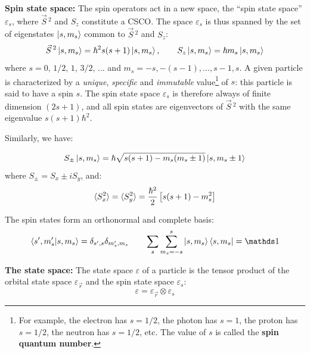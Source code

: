 \begin{postulate}
    \textbf{Spin state space:} The spin operators act in a new space, the ``spin state space'' $\varepsilon_s$, where $\vec{S}\,^2$ and $S_z$ constitute a CSCO. The space $\varepsilon_s$ is thus spanned by the set of eigenstates $\ket{s,m_s}$ common to $\vec{S}\,^2$ and $S_z$:
    \begin{equation} \label{eigenstates_of_S2_and_Sz}
        \vec{S}\,^2 \ket{s, m_s} = \hbar^2s(s+1)\ket{s, m_s}, \qquad S_z \ket{s, m_s} = \hbar m_s\ket{s, m_s}
    \end{equation}
    where $s = 0,\, 1/2,\, 1,\, 3/2,\, ...$ and $m_s = -s, -(s-1), ..., s-1, s$. A given particle is characterized by a \textit{unique}, \textit{specific} and \textit{immutable} value\footnote{For example, the electron has $s = 1/2$, the photon has $s = 1$, the proton has $s = 1/2$, the neutron has $s = 1/2$, etc. The value of $s$ is called the \textbf{spin quantum number}.} of $s$: this particle is said to have a spin $s$. The spin state space $\varepsilon_s$ is therefore always of finite dimension $(2s + 1)$, and all spin states are eigenvectors of $\vec{S}\,^2$ with the same eigenvalue $s(s + 1)\hbar^2$.
    
    Similarly, we have:

    \begin{equation} \label{eq:spin_pm_ops}
        S_\pm \ket{s, m_s} = \hbar \sqrt{s(s+1)-m_s(m_s\pm 1)}\ket{s, m_s\pm 1}
    \end{equation}
    where $S_\pm = S_x \pm iS_y$, and:
    \begin{equation}
        \braket{S_x^2} = \braket{S_y^2} = \frac{\hbar^2}{2}\left[s(s+1) - m_s^2\right]
    \end{equation}

    The spin states form an orthonormal and complete basis:
    \begin{equation}
        \braket{s', m_s'|s, m_s} = \delta_{s',s}\delta_{m_s',m_s} \qquad \sum_s\sum_{m_s=-s}^{s}\ket{s,m_s}\bra{s,m_s} = \Imat
    \end{equation}
\end{postulate}

\begin{postulate} \label{postulate:tensor_product}
    \textbf{The state space:} The state space $\varepsilon$ of a particle is the tensor product of the orbital state space $\varepsilon_{\vec{r}}$ and the spin state space $\varepsilon_s$:
    \begin{equation}
        \varepsilon = \varepsilon_{\vec{r}} \otimes \varepsilon_s
    \end{equation}
\end{postulate}

